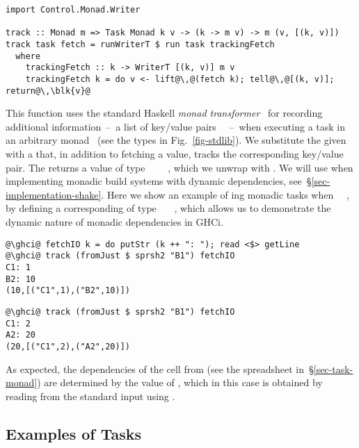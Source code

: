 \vspace{1mm}
\begin{verbatim}
import Control.Monad.Writer

track :: Monad m => Task Monad k v -> (k -> m v) -> m (v, [(k, v)])
track task fetch = runWriterT $ run task trackingFetch
  where
    trackingFetch :: k -> WriterT [(k, v)] m v
    trackingFetch k = do v <- lift@\,@(fetch k); tell@\,@[(k, v)]; return@\,\blk{v}@
\end{verbatim}
\vspace{1mm}

\noindent
This function uses the standard Haskell  \emph{monad
transformer}~\cite{liang1995monad} for recording additional
information~--~a list of key/value pairs \hs{[(@@k,}~\hs{v)]}~--~when executing
a task in an arbitrary monad~ (see the types in Fig.~\ref{fig-stdlib}).
We substitute the given  with a
 that, in addition to fetching a value, tracks the
corresponding key/value pair. The  returns a value of type
~\hs{[(@@k,}~\hs{v)]}~~, which we unwrap with
. We will use  when implementing monadic build systems
with dynamic dependencies, see~\S\ref{sec-implementation-shake}. Here we show an
example of ing monadic tasks when ~\hs{=}~, by defining
a corresponding  of type ~\hs{->}~~,
which allows us to demonstrate the dynamic nature of monadic dependencies in
GHCi.

\vspace{1mm}
\begin{verbatim}
@\ghci@ fetchIO k = do putStr (k ++ ": "); read <$> getLine
@\ghci@ track (fromJust $ sprsh2 "B1") fetchIO
C1: 1
B2: 10
(10,[("C1",1),("B2",10)])
\end{verbatim}
\vspace{-2mm}
\begin{verbatim}
@\ghci@ track (fromJust $ sprsh2 "B1") fetchIO
C1: 2
A2: 20
(20,[("C1",2),("A2",20)])
\end{verbatim}
\vspace{1mm}

\noindent
As expected, the dependencies of the cell  from  (see the
spreadsheet in~\S\ref{sec-task-monad}) are determined by the value of ,
which in this case is obtained by reading from the standard input using
.

\subsection{Examples of Tasks}\label{sec-task-examples}

